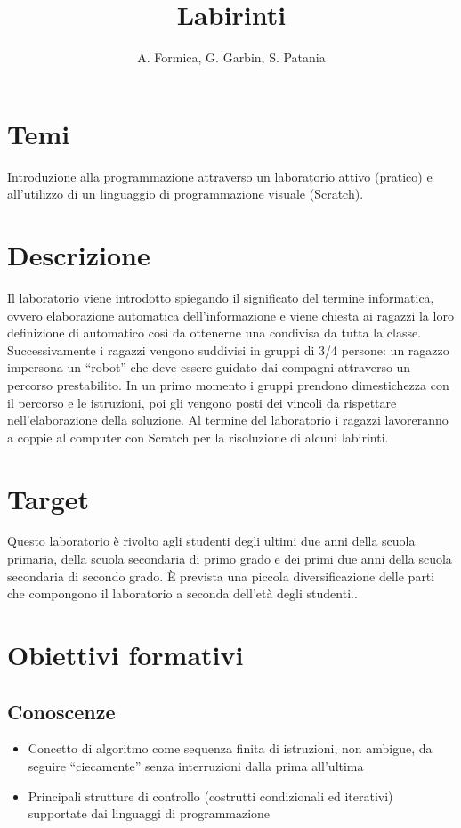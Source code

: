 \documentclass[12pt]{article}
\title{Labirinti}
\author{A. Formica, G. Garbin, S. Patania}
\begin{document}
\maketitle
%
% 
\section{Temi}
Introduzione alla programmazione attraverso un laboratorio attivo (pratico) e all’utilizzo di un linguaggio di programmazione visuale (Scratch).
%
%
\section{Descrizione}
Il laboratorio viene introdotto spiegando il significato del termine informatica, ovvero elaborazione automatica dell’informazione e viene chiesta ai ragazzi la loro definizione di automatico così da ottenerne una condivisa da tutta la classe. Successivamente i ragazzi vengono suddivisi in gruppi di 3/4 persone: un ragazzo impersona un “robot” che deve essere guidato dai compagni attraverso un percorso prestabilito. In un primo momento i gruppi prendono dimestichezza con il percorso e le istruzioni, poi gli vengono posti dei vincoli da rispettare nell'elaborazione della soluzione. Al termine del laboratorio i ragazzi lavoreranno a coppie al computer con Scratch per la risoluzione di alcuni labirinti.
%
%
\section{Target}
Questo laboratorio è rivolto agli studenti degli ultimi due anni della scuola primaria, della scuola secondaria di primo grado e dei primi due anni della scuola secondaria di secondo grado. \`E prevista una piccola diversificazione delle parti che compongono il laboratorio a seconda dell'età degli studenti..
%
%
\section{Obiettivi formativi}
\subsection{Conoscenze}
\begin{itemize}
\item Concetto di algoritmo come sequenza finita di istruzioni, non ambigue, da seguire “ciecamente” senza interruzioni dalla prima all’ultima
\item Principali strutture di controllo (costrutti condizionali ed iterativi) supportate dai linguaggi di programmazione
\end{itemize}
\end{document}
